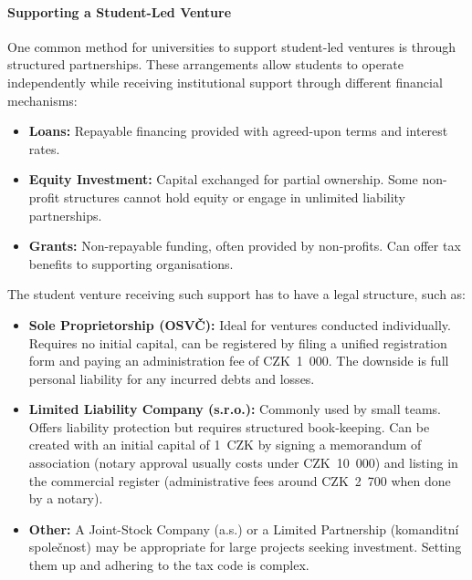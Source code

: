 \paragraph{Supporting a Student-Led Venture}\label{subsec:supporting-student-venture}
One common method for universities to support student-led ventures is through structured partnerships. These arrangements allow students to operate independently while receiving institutional support through different financial mechanisms:
\begin{itemize}
    \item \textbf{Loans:} Repayable financing provided with agreed-upon terms and interest rates.
    \item \textbf{Equity Investment:} Capital exchanged for partial ownership. Some non-profit structures cannot hold equity or engage in unlimited liability partnerships.
    \item \textbf{Grants:} Non-repayable funding, often provided by non-profits. Can offer tax benefits to supporting organisations.
\end{itemize}
The student venture receiving such support has to have a legal structure, such as:
\begin{itemize}
    \item \textbf{Sole Proprietorship (OSVČ):} Ideal for ventures conducted individually. Requires no initial capital, can be registered by filing a unified registration form and paying an administration fee of CZK~1~000. The downside is full personal liability for any incurred debts and losses.
    \item \textbf{Limited Liability Company (s.r.o.):} Commonly used by small teams. Offers liability protection but requires structured book-keeping. Can be created with an initial capital of 1~CZK by signing a memorandum of association (notary approval usually costs under CZK~10~000) and listing in the commercial register (administrative fees around CZK~2~700 when done by a notary).
    \item \textbf{Other:} A Joint-Stock Company (a.s.) or a Limited Partnership (komanditní společnost) may be appropriate for large projects seeking investment. Setting them up and adhering to the tax code is complex.
\end{itemize}

